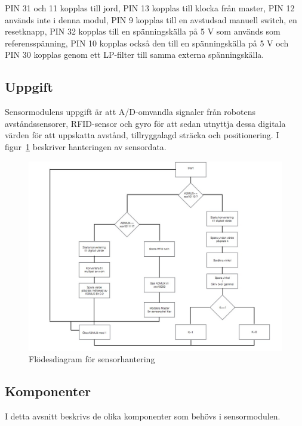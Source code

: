 \documentclass[a4paper,12pt,fleqn]{article}
\begin{document}
PIN 31 och 11 kopplas till jord, PIN 13 kopplas till klocka från master, PIN 12 används inte i denna modul, PIN 9 kopplas till en avstudsad manuell switch, en resetknapp, PIN 32 kopplas till en spänningskälla på 5 V som används som referensspänning, PIN 10 kopplas också den till en spänningskälla på 5 V och PIN 30 kopplas genom ett LP-filter till samma externa spänningskälla.

\subsection{Uppgift}
Sensormodulens uppgift är att A/D-omvandla signaler från robotens avståndssensorer, RFID-sensor och gyro för att sedan utnyttja dessa digitala värden för att uppskatta avstånd, tillryggalagd sträcka och positionering. I figur~\ref{fig:sensorflow} beskriver hanteringen av sensordata.

\begin{figure}[htp] %
  \begin{center}
  \includegraphics[keepaspectratio=true,width=\linewidth]{sensorflode}  %
  \end{center}
  \caption{Flödesdiagram för sensorhantering} %
  \label{fig:sensorflow}
\end{figure}

\subsection{Komponenter}
I detta avsnitt beskrivs de olika komponenter som behövs i sensormodulen.
\end{document}
